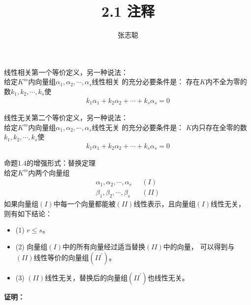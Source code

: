 \documentclass{article}
\begin{document}
\title{2.1 注释}
\author{张志聪}
\maketitle

\begin{zremark}
  线性相关第一个等价定义，另一种说法：\\
  给定$K^m$内向量组$\alpha_1, \alpha_2, \cdots, \alpha_s$线性相关
  的充分必要条件是：
  存在$K$内不全为零的数$k_1, k_2, \cdots, k_s$使
  \begin{align*}
    k_1 \alpha_1 + k_2 \alpha_2 + \cdots + k_s \alpha_s = 0
  \end{align*}
\end{zremark}

\begin{zremark}
  线性无关第二个等价定义，另一种说法：\\
  给定$K^m$内向量组$\alpha_1, \alpha_2, \cdots, \alpha_s$线性无关
  的充分必要条件是：
  $K$内只存在全零的数$k_1, k_2, \cdots, k_s$使
  \begin{align*}
    k_1 \alpha_1 + k_2 \alpha_2 + \cdots + k_s \alpha_s = 0
  \end{align*}
\end{zremark}

\begin{zremark}
  命题1.4的增强形式：替换定理 \\
  给定$K^m$内两个向量组
  \begin{align*}
    \alpha_1, \alpha_2, \cdots, \alpha_r & \ \ \ (I)  \\
    \beta_1, \beta_2, \cdots, \beta_s    & \ \ \ (II)
  \end{align*}
  如果向量组$(I)$中每一个向量都能被$(II)$线性表示，且向量组$(I)$线性无关，
  则有如下结论：
  \begin{itemize}
    \item (1) $r \leq s$。
    \item (2) 向量组$(I)$中的所有向量经过适当替换$(II)$中的向量，
          可以得到与$(II)$线性等价的向量组$(II^\prime)$。
    \item (3) $(II)$线性无关，替换后的向量组$(II^\prime)$也线性无关。
  \end{itemize}
\end{zremark}

\textbf{证明：}
\end{document}

